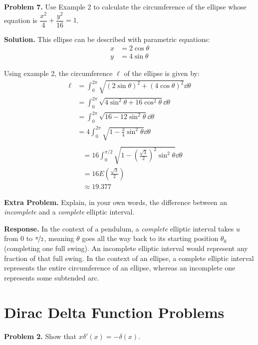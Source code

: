 \documentclass{article}
\begin{document}
\textbf{Problem 7.} Use Example 2 to calculate the circumference of the ellipse whose equation is $\dfrac{x^2}{4} + \dfrac{y^2}{16} = 1$.

\textbf{Solution.} This ellipse can be described with parametric equations:
\begin{equation*}
\begin{aligned}
x &= 2\cos\theta \\
y &= 4\sin\theta
\end{aligned}
\end{equation*}

Using example 2, the circumference $\ell$ of the ellipse is given by:
\begin{equation*}
\begin{aligned}
\ell &= \int_{0}^{2\pi}\sqrt{(2\sin\theta)^2 + (4\cos\theta)^2}\dd\theta \\
&= \int_{0}^{2\pi}\sqrt{4\sin^2\theta + 16\cos^2\theta}\dd\theta \\
&= \int_{0}^{2\pi}\sqrt{16 - 12\sin^2\theta}\dd\theta \\
&= 4\int_{0}^{2\pi}\sqrt{1 - \frac{3}{4}\sin^2\theta}\dd\theta \\
\end{aligned}
\end{equation*}
\begin{equation*}
\begin{aligned}
&= 16\int_{0}^{\pi/2}\sqrt{1 - \left(\frac{\sqrt{3}}{2}\right)^2\sin^2\theta}\dd\theta \\
&= 16E\left(\frac{\sqrt{3}}{2}\right) \\
&\approx 19.377
\end{aligned}
\end{equation*}

\textbf{Extra Problem.} Explain, in your own words, the difference between an \textit{incomplete} and a \textit{complete} elliptic interval.

\textbf{Response.} In the context of a pendulum, a \textit{complete} elliptic interval takes $u$ from 0 to $\nicefrac{\pi}{2}$, meaning $\theta$ goes all the way back to its starting position $\theta_0$ (completing one full swing). An incomplete elliptic interval would represent any fraction of that full swing. In the context of an ellipse, a complete elliptic interval represents the entire circumference of an ellipse, whereas an incomplete one represents some subtended arc.

\section*{Dirac Delta Function Problems}
\textbf{Problem 2.} Show that $x\delta '(x) = -\delta (x)$.
\end{document}

